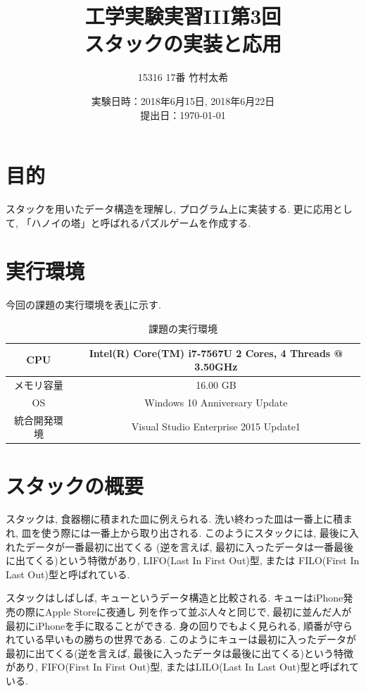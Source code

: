 \documentclass[a4j]{jsarticle}
\title {工学実験実習III第3回\\スタックの実装と応用}
\author {15316 17番 竹村太希}
\date{実験日時：2018年6月15日, 2018年6月22日
\\ 提出日：\today}
\begin{document}
\maketitle
\thispagestyle{empty}
\newpage
\setcounter{page}{1}
\pagestyle{plain}

\section{目的}
    スタックを用いたデータ構造を理解し, プログラム上に実装する. 
    更に応用として, 「ハノイの塔」と呼ばれるパズルゲームを作成する. 


\section{実行環境}
今回の課題の実行環境を表\ref{t-1}に示す. 

\begin{table}[htbp]
\centering
\caption{課題の実行環境}
\label{t-1}
\begin{tabular}{|c||c|}
\hline
 CPU & Intel(R) Core(TM) i7-7567U 2 Cores, 4 Threads @ 3.50GHz \\
\hline
 メモリ容量 & 16.00 GB \\
\hline
 OS & Windows 10 Anniversary Update \\
\hline
 統合開発環境 & Visual Studio Enterprise 2015 Update1\\
\hline
\end{tabular}
\end{table}

\section{スタックの概要}
    スタックは, 食器棚に積まれた皿に例えられる. 洗い終わった皿は一番上に積まれ, 
    皿を使う際には一番上から取り出される.  
    このようにスタックには, 最後に入れたデータが一番最初に出てくる
    (逆を言えば, 最初に入ったデータは一番最後に出てくる)という特徴があり, LIFO(Last In First Out)型, または
    FILO(First In Last Out)型と呼ばれている. 

    スタックはしばしば, キューというデータ構造と比較される. キューはiPhone発売の際にApple Storeに夜通し
    列を作って並ぶ人々と同じで, 最初に並んだ人が最初にiPhoneを手に取ることができる. 
    身の回りでもよく見られる, 順番が守られている早いもの勝ちの世界である. 
    このようにキューは最初に入ったデータが最初に出てくる(逆を言えば, 最後に入ったデータは最後に出てくる)という特徴があり, 
    FIFO(First In First Out)型, またはLILO(Last In Last Out)型と呼ばれている. 
    
\end{document}
